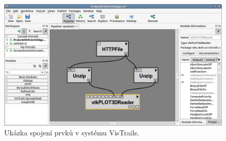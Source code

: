 \newpage

\begin{figure}[h]
	\centering
	\includegraphics[scale=0.5]{pictures/qt/vt}
	\caption{Ukázka spojení prvků v systému VisTrails.}
	\label{vt}
\end{figure}
